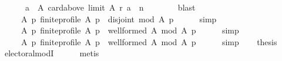 \begin{isabellebody}
\ \ \ \ \ \ {\isacharbraceleft}{\kern0pt}a\ {\isasymin}\ A{\isachardot}{\kern0pt}\ card{\isacharparenleft}{\kern0pt}above\ {\isacharparenleft}{\kern0pt}limit\ A\ r{\isacharparenright}{\kern0pt}\ a{\isacharparenright}{\kern0pt}\ {\isasymle}\ n{\isacharbraceright}{\kern0pt}\ {\isacharequal}{\kern0pt}\ {\isacharbraceleft}{\kern0pt}{\isacharbraceright}{\kern0pt}{\isachardoublequoteclose}\isanewline
\ \ \ \ \isamarkupfalse%
\ blast\isanewline
\ \ \isamarkupfalse%
\ {}{\isacharcolon}{\kern0pt}\isanewline
\ \ \ \ {\isachardoublequoteopen}{\isasymforall}\ A\ p{\isachardot}{\kern0pt}\ finite{\isacharunderscore}{\kern0pt}profile\ A\ p\ {\isasymlongrightarrow}\ disjoint{}\ {\isacharparenleft}{\kern0pt}{\isacharquery}{\kern0pt}mod\ A\ p{\isacharparenright}{\kern0pt}{\isachardoublequoteclose}\isanewline
\ \ \ \ \isamarkupfalse%
\ simp\isanewline
\ \ \isamarkupfalse%
\ {}\ {}\isanewline
\ \ \isamarkupfalse%
\isanewline
\ \ \ \ {\isachardoublequoteopen}{\isasymforall}\ A\ p{\isachardot}{\kern0pt}\ finite{\isacharunderscore}{\kern0pt}profile\ A\ p\ {\isasymlongrightarrow}\ well{\isacharunderscore}{\kern0pt}formed\ A\ {\isacharparenleft}{\kern0pt}{\isacharquery}{\kern0pt}mod\ A\ p{\isacharparenright}{\kern0pt}{\isachardoublequoteclose}\isanewline
\ \ \ \ \isamarkupfalse%
\ simp\isanewline
\ \ \isamarkupfalse%
\isanewline
\ \ \ \ {\isachardoublequoteopen}{\isasymforall}\ A\ p{\isachardot}{\kern0pt}\ finite{\isacharunderscore}{\kern0pt}profile\ A\ p\ {\isasymlongrightarrow}\ well{\isacharunderscore}{\kern0pt}formed\ A\ {\isacharparenleft}{\kern0pt}{\isacharquery}{\kern0pt}mod\ A\ p{\isacharparenright}{\kern0pt}{\isachardoublequoteclose}\isanewline
\ \ \ \ \isamarkupfalse%
\ simp\isanewline
\ \ \isamarkupfalse%
\ {\isacharquery}{\kern0pt}thesis\isanewline
\ \ \ \ \isamarkupfalse%
\ electoral{\isacharunderscore}{\kern0pt}modI\isanewline
\ \ \ \ \isamarkupfalse%
\ metis\isanewline
{}\isamarkupfalse%
%
\endisatagproof
{\isafoldproof}%
%
\isadelimproof
\isanewline
%
\endisadelimproof
%
\isadelimtheory
\isanewline
%
\endisadelimtheory
%
\isatagtheory
{}\isamarkupfalse%
%
\endisatagtheory
{\isafoldtheory}%
%
\isadelimtheory
%
\endisadelimtheory
%
\end{isabellebody}%
\endinput

